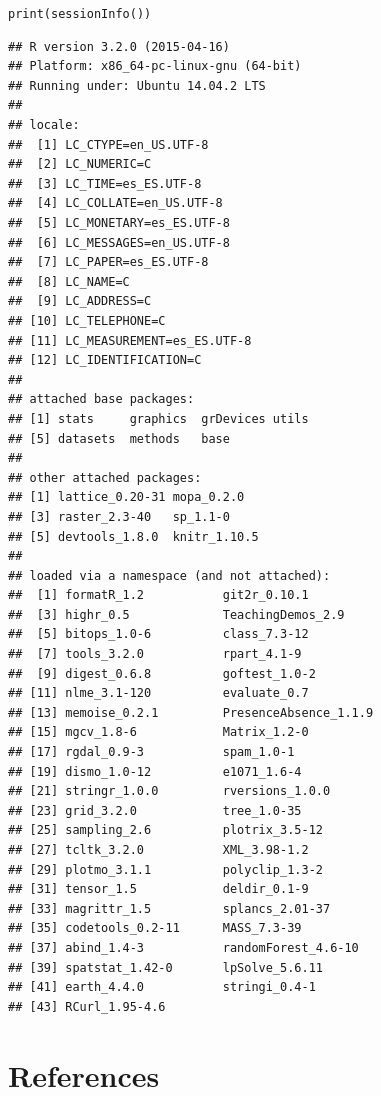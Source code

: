 \documentclass[10pt,a4paper]{article}\usepackage[]{graphicx}\usepackage[]{color}
\makeatletter
\newcommand{\hlstd}[1]{\textcolor[rgb]{0,0,0}{#1}}%
\newcommand{\hlkwd}[1]{\textcolor[rgb]{0,0.267,0.4}{#1}}%
\newenvironment{kframe}{%
 \def\at@end@of@kframe{}%
 \ifinner\ifhmode%
  \def\at@end@of@kframe{\end{minipage}}%
  \begin{minipage}{\columnwidth}%
 \fi\fi%
 \def\FrameCommand##1{\hskip\@totalleftmargin \hskip-\fboxsep
 \colorbox{shadecolor}{##1}\hskip-\fboxsep
     \hskip-\linewidth \hskip-\@totalleftmargin \hskip\columnwidth}%
 \MakeFramed {\advance\hsize-\width
   \@totalleftmargin\z@ \linewidth\hsize
   \@setminipage}}%
 {\par\unskip\endMakeFramed%
 \at@end@of@kframe}
\newenvironment{knitrout}{}{} %
\makeatother
\begin{document}
\begin{knitrout}
\color{fgcolor}\begin{kframe}
\begin{alltt}
\hlkwd{print}\hlstd{(}\hlkwd{sessionInfo}\hlstd{())}
\end{alltt}
\begin{verbatim}
## R version 3.2.0 (2015-04-16)
## Platform: x86_64-pc-linux-gnu (64-bit)
## Running under: Ubuntu 14.04.2 LTS
## 
## locale:
##  [1] LC_CTYPE=en_US.UTF-8      
##  [2] LC_NUMERIC=C              
##  [3] LC_TIME=es_ES.UTF-8       
##  [4] LC_COLLATE=en_US.UTF-8    
##  [5] LC_MONETARY=es_ES.UTF-8   
##  [6] LC_MESSAGES=en_US.UTF-8   
##  [7] LC_PAPER=es_ES.UTF-8      
##  [8] LC_NAME=C                 
##  [9] LC_ADDRESS=C              
## [10] LC_TELEPHONE=C            
## [11] LC_MEASUREMENT=es_ES.UTF-8
## [12] LC_IDENTIFICATION=C       
## 
## attached base packages:
## [1] stats     graphics  grDevices utils    
## [5] datasets  methods   base     
## 
## other attached packages:
## [1] lattice_0.20-31 mopa_0.2.0     
## [3] raster_2.3-40   sp_1.1-0       
## [5] devtools_1.8.0  knitr_1.10.5   
## 
## loaded via a namespace (and not attached):
##  [1] formatR_1.2           git2r_0.10.1         
##  [3] highr_0.5             TeachingDemos_2.9    
##  [5] bitops_1.0-6          class_7.3-12         
##  [7] tools_3.2.0           rpart_4.1-9          
##  [9] digest_0.6.8          goftest_1.0-2        
## [11] nlme_3.1-120          evaluate_0.7         
## [13] memoise_0.2.1         PresenceAbsence_1.1.9
## [15] mgcv_1.8-6            Matrix_1.2-0         
## [17] rgdal_0.9-3           spam_1.0-1           
## [19] dismo_1.0-12          e1071_1.6-4          
## [21] stringr_1.0.0         rversions_1.0.0      
## [23] grid_3.2.0            tree_1.0-35          
## [25] sampling_2.6          plotrix_3.5-12       
## [27] tcltk_3.2.0           XML_3.98-1.2         
## [29] plotmo_3.1.1          polyclip_1.3-2       
## [31] tensor_1.5            deldir_0.1-9         
## [33] magrittr_1.5          splancs_2.01-37      
## [35] codetools_0.2-11      MASS_7.3-39          
## [37] abind_1.4-3           randomForest_4.6-10  
## [39] spatstat_1.42-0       lpSolve_5.6.11       
## [41] earth_4.4.0           stringi_0.4-1        
## [43] RCurl_1.95-4.6
\end{verbatim}
\end{kframe}
\end{knitrout}


\section{References}
\end{document}
